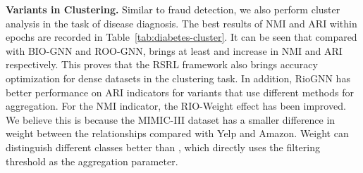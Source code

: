 \begin{table}[h]
    \setlength{\abovecaptionskip}{0.cm}
    \setlength{\belowcaptionskip}{-0.cm}
    \caption{Diabetes diagnosis clustering results () compared to \RioGNN variants.}\label{tab:diabetes-cluster}
    \centering
\end{table}

\textbf{\RioGNN Variants in Clustering. }
Similar to fraud detection, we also perform cluster analysis in the task of disease diagnosis. 
The best results of NMI and ARI within  epochs are recorded in Table~\ref{tab:diabetes-cluster}. 
It can be seen that compared with BIO-GNN and ROO-GNN, \RioGNN brings at least  and  increase in NMI and ARI respectively. 
This proves that the RSRL framework also brings accuracy optimization for dense datasets in the clustering task. 
In addition, RioGNN has better performance on ARI indicators for variants that use different methods for aggregation. 
For the NMI indicator, the RIO-Weight effect has been improved. 
We believe this is because the MIMIC-III dataset has a smaller difference in weight between the relationships compared with Yelp and Amazon. 
Weight can distinguish different classes better than \RioGNN, which directly uses the filtering threshold as the aggregation parameter.


